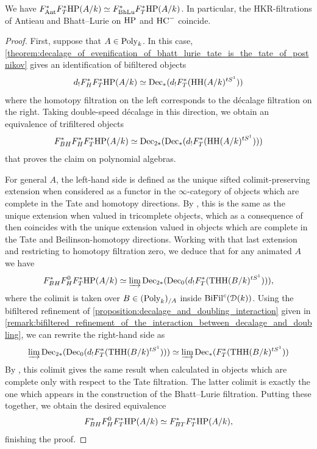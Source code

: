 \documentclass[oneside,a4paper]{amsart}
\begin{document}
\begin{lemma}
We have $F^{\ast}_{\mathrm{Ant}} F^*_T \mathrm{HP}(A / k) \simeq F^{\ast}_{\mathrm{BhLu}} F^*_T \mathrm{HP}(A/k)$. In particular, the HKR-filtrations of Antieau and Bhatt--Lurie on $\mathrm{HP}$ and $\mathrm{HC}^-$ coincide. 
\end{lemma}

\begin{proof} 
First, suppose that $A \in \mathrm{Poly}_{k}$. In this case, \cref{theorem:decalage_of_evenification_of_bhatt_lurie_tate_is_the_tate_of_postnikov} gives an identification of bifiltered objects 
\[
d_{!} F^{\ast}_{H} F^{\ast}_{T} \mathrm{HP}(A/k) \simeq \mathrm{Dec}_{\ast}(d_{!} F_{T}^{\ast}(\operatorname{HH}(A/k)^{tS^{1}}))
\]
where the homotopy filtration on the left corresponds to the d\'{e}calage filtration on the right. Taking double-speed d\'{e}calage in this direction, we obtain an equivalence of trifiltered objects 
\[
F^{\ast}_{BH} F^{\ast}_{H} F^{\ast}_{T} \mathrm{HP}(A/k) \simeq \mathrm{Dec}_{2 \ast}(\mathrm{Dec}_{\ast}(d_{!} F^{\ast}_{T}(\operatorname{HH}(A/k)^{tS^{1}})))
\]
that proves the claim on polynomial algebras.

For general $A$, the left-hand side is defined as the unique sifted colimit-preserving extension when considered as a functor in the $\infty$-category of objects which are complete in the Tate and homotopy directions. By \cite[{Lemma~4.8}]{antieau:decalage}, this is the same as the unique extension when valued in tricomplete objects, which as a consequence of \cite[{Lemma~4.9}]{antieau:decalage} then coincides with the unique extension valued in objects which are complete in the Tate and Beilinson-homotopy directions. Working with that last extension and restricting to homotopy filtration zero, we deduce that for any animated $A$ we have 
\[
F^{\ast}_{BH} F^{0}_{H} F^{\ast}_{T} \mathrm{HP}(A/k) \simeq 
\varinjlim \mathrm{Dec}_{2 \ast}(\mathrm{Dec}_{0}(d_{!} F^{\ast}_{T}(\operatorname{THH}(B/k)^{tS^{1}}))), 
\]
where the colimit is taken over $B \in (\mathrm{Poly}_{k})_{/A}$ inside $\mathrm{BiFil}^{c}(\EuScript{D}(k))$. Using the bifiltered refinement of \cref{proposition:decalage_and_doubling_interaction} given in \cref{remark:bifiltered_refinement_of_the_interaction_between_decalage_and_doubling}, 
we can rewrite the right-hand side as 
\[
\varinjlim \mathrm{Dec}_{2 \ast}(\mathrm{Dec}_{0}(d_{!} F^{\ast}_{T}(\operatorname{THH}(B/k)^{tS^{1}}))) \simeq \varinjlim \mathrm{Dec}_{\ast}(F^{\ast}_{T}(\operatorname{THH}(B/k)^{tS^{1}}))
\]
By \cite[{Remark 6.3.5}]{bhatt-lurie:apc}, this colimit gives the same result when calculated in objects which are complete only with respect to the Tate filtration. The latter colimit is exactly the one which appears in the construction of the Bhatt--Lurie filtration. Putting these together, we obtain the desired equivalence 
\[
F^{\ast}_{BH} F^{0}_{H} F^{\ast}_{T} \mathrm{HP}(A/k) \simeq F^{\ast}_{BT} F^{\ast}_{T} \mathrm{HP}(A/k), 
\]
finishing the proof.
\end{proof}
\end{document}
